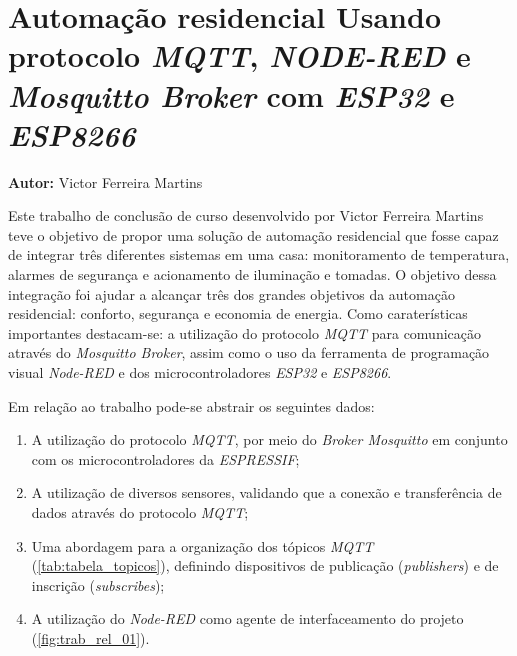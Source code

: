 \newpage

\section{Automação residencial Usando protocolo \textit{MQTT}, \textit{NODE-RED} e \textit{Mosquitto Broker} com \textit{ESP32} e \textit{ESP8266}}

\textbf{Autor:} Victor Ferreira Martins
\vspace{\onelineskip}

Este trabalho de conclusão de curso desenvolvido por Victor Ferreira Martins teve o objetivo de propor uma solução de automação residencial que fosse capaz de integrar três diferentes sistemas em uma casa: monitoramento de temperatura, alarmes de segurança e acionamento de iluminação e tomadas. O objetivo dessa integração foi ajudar a alcançar três dos grandes objetivos da automação residencial: conforto, segurança e economia de energia.
Como caraterísticas importantes destacam-se: a utilização do protocolo\textit{ MQTT} para comunicação através do \textit{Mosquitto Broker}, assim como o uso da ferramenta de programação visual \textit{Node-RED} e dos microcontroladores \textit{ESP32} e \textit{ESP8266}.

Em relação ao trabalho pode-se abstrair os seguintes dados:

\begin{enumerate}
	\item A utilização do protocolo \textit{MQTT}, por meio do \textit{Broker Mosquitto} em conjunto com os microcontroladores da \textit{ESPRESSIF};
	\item A utilização de diversos sensores, validando que a conexão e transferência de dados através do protocolo \textit{MQTT};
	\item Uma abordagem para a organização dos tópicos \textit{MQTT} (\autoref{tab:tabela_topicos}), definindo dispositivos de publicação (\textit{publishers}) e de inscrição (\textit{subscribes});
	\item A utilização do \textit{Node-RED} como agente de interfaceamento do projeto (\autoref{fig:trab_rel_01}).
\end{enumerate}

